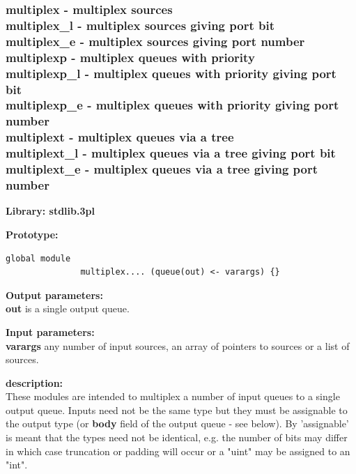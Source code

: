         \subsubsection{multiplex - multiplex sources\\
                    multiplex\_l - multiplex sources giving port bit\\
                    multiplex\_e - multiplex sources giving port number\\
                    multiplexp - multiplex queues with priority\\
                    multiplexp\_l - multiplex queues with priority giving port bit\\
                    multiplexp\_e - multiplex queues with priority giving port number\\
                    multiplext - multiplex queues via a tree\\
                    multiplext\_l - multiplex queues via a tree giving port bit\\
                    multiplext\_e - multiplex queues via a tree giving port number}\label{sec:lmmultiplex}

            {\bf Library: stdlib.3pl}

            {\bf Prototype:} \\
            \vsp
            \begin{lstlisting}[gobble=12, language=threepl]
               global module
               multiplex.... (queue(out) <- varargs) {}
            \end{lstlisting}

            {\bf Output parameters:} \\
            {\bf out} is a single output queue.

            {\bf Input parameters:} \\
            {\bf varargs} any number of input sources, an array of pointers
            to sources or a list of sources.

            {\bf description:} \\
            These modules are intended to multiplex a number of input queues to a
            single output queue. Inputs need not be the same type but they must
            be assignable to the output type (or {\bf body} field of the output
            queue - see below). By 'assignable' is meant that the types need not
            be identical, e.g. the number of bits may differ in which case
            truncation or padding will occur or a "uint" may be assigned to an
            "int".          
            
